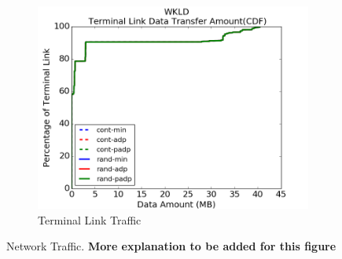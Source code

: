 \documentclass[conference,compsoc]{IEEEtran}
\begin{document}
\begin{figure}[t!]
\begin{subfigure}[t]{0.32\textwidth}
        \centering
        \includegraphics[height=1.8 in]{wkld/tl-traffic}
        \caption{Terminal Link Traffic}
        \label{fig:terminal-link-traffic}
    \end{subfigure}%
  \caption{Network Traffic. \textbf{More explanation to be added for this figure}}
   \label{fig:wkld-network-traffic}
\end{figure}
\end{document}
